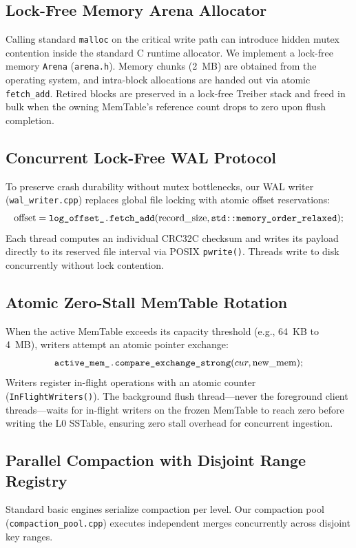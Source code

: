 \documentclass[conference]{IEEEtran}
\begin{document}
\subsection{Lock-Free Memory Arena Allocator}
Calling standard \texttt{malloc} on the critical write path can introduce hidden mutex contention inside the standard C runtime allocator. We implement a lock-free memory \texttt{Arena} (\texttt{arena.h}). Memory chunks (2~MB) are obtained from the operating system, and intra-block allocations are handed out via atomic \texttt{fetch\_add}. Retired blocks are preserved in a lock-free Treiber stack and freed in bulk when the owning MemTable's reference count drops to zero upon flush completion.

\subsection{Concurrent Lock-Free WAL Protocol}
To preserve crash durability without mutex bottlenecks, our WAL writer (\texttt{wal\_writer.cpp}) replaces global file locking with atomic offset reservations:
\begin{equation}
\text{offset} = \texttt{log\_offset\_.\text{fetch\_add}}(\text{record\_size}, \texttt{std::memory\_order\_relaxed});
\end{equation}
Each thread computes an individual CRC32C checksum and writes its payload directly to its reserved file interval via POSIX \texttt{pwrite()}. Threads write to disk concurrently without lock contention.

\subsection{Atomic Zero-Stall MemTable Rotation}
When the active MemTable exceeds its capacity threshold (e.g., 64~KB to 4~MB), writers attempt an atomic pointer exchange:
\begin{equation}
\texttt{active\_mem\_.\text{compare\_exchange\_strong}}(cur, \text{new\_mem});
\end{equation}
Writers register in-flight operations with an atomic counter (\texttt{InFlightWriters()}). The background flush thread—never the foreground client threads—waits for in-flight writers on the frozen MemTable to reach zero before writing the L0 SSTable, ensuring zero stall overhead for concurrent ingestion.

\subsection{Parallel Compaction with Disjoint Range Registry}
Standard basic engines serialize compaction per level. Our compaction pool (\texttt{compaction\_pool.cpp}) executes independent merges concurrently across disjoint key ranges. 
\end{document}
